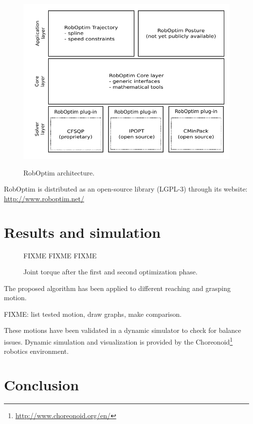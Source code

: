 \documentclass[letterpaper, 10 pt, conference]{ieeeconf}  %
\begin{document}
\begin{figure}[htbp!]
  \includegraphics[width=\linewidth]{figure/roboptim-architecture.pdf}
  \label{fig:roboptim}
  \caption{RobOptim  architecture.}
\end{figure}


RobOptim is distributed as an open-source library (\mbox{LGPL-3}) through its
website: \url{http://www.roboptim.net/}



\section{Results and simulation}
\label{sec:results}


\begin{figure}[htbp!]
  FIXME FIXME FIXME
  \label{fig:results-torque}
  \caption{Joint torque after the first and second optimization
    phase.}
\end{figure}



The proposed algorithm has been applied to different reaching and
grasping motion.


FIXME: list tested motion, draw graphs, make comparison.


These motions have been validated in a dynamic simulator to check for
balance issues. Dynamic simulation and visualization is provided by
the Choreonoid\footnote{\url{http://www.choreonoid.org/en/}} robotics
environment.



\section{Conclusion}
\label{sec:conclusion}
\end{document}
